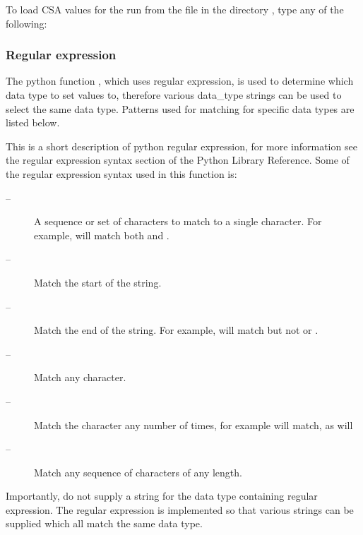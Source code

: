 To load CSA values for the run 
 from the file 
 in the directory 
, type
any of the following:








\subsubsection{Regular expression}

The python  function 
, which uses regular expression,  is used to determine which data
type to set values to, therefore various data\_type strings can be used to select the same
data type.  Patterns used for matching for specific data types are listed below.

This is a short description of python  regular expression,  for more information see the
regular expression  syntax section of the Python  Library Reference.  Some of the regular
expression syntax used in this function is:

\begin{description}
\item[    
 --]   A sequence  or set of characters to match to a single character.  For example, 
 will match both 
 and 
. 
\item[    
 --]   Match the start of the string. 
\item[    
 --]   Match the end of the string.  For example, 
 will match 
 but not 
 or 
. 
\item[    
 --]   Match any character. 
\item[    
 --]   Match the character 
 any number of times, for example 
 will match, as will 
 
\item[    
 --]   Match any sequence  of characters of any length. 
\end{description}
Importantly, do not supply a string for the data type containing regular expression.   The
regular expression  is implemented so that various strings can be supplied which all match
the same data type.


